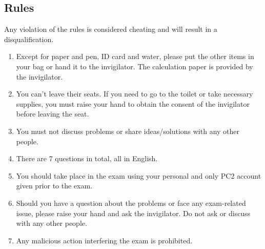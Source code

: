 \subsection*{Rules}
Any violation of the rules is considered cheating and will result in a disqualification.
\begin{enumerate}
    \item Except for paper and pen, ID card and water, please put the other items in your bag or hand it to the invigilator. The calculation paper is provided by the invigilator.
    \item You can't leave their seats. If you need to go to the toilet or take necessary supplies, you must raise your hand to obtain the consent of the invigilator before leaving the seat.
    \item You must not discuss problems or share ideas/solutions with any other people.
    \item There are 7 questions in total, all in English.
    \item You should take place in the exam using your personal and only PC2 account given prior to the exam.
    \item Should you have a question about the problems or face any exam-related issue, please raise your hand and ask the invigilator. Do not ask or discuss with any other people.
    \item Any malicious action interfering the exam is prohibited.
\end{enumerate}
\newpage
